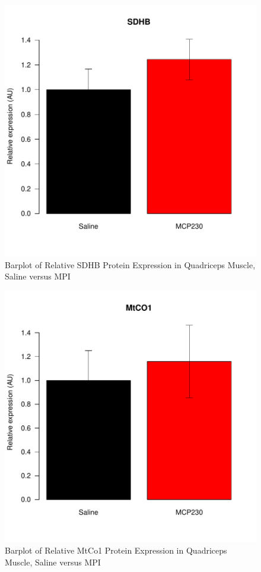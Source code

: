 \documentclass{article}
\begin{document}
\begin{figure}
\begin{center}
\includegraphics{2016-01-21_MitochondrialProteins-barplotSDHB}
\end{center}
\caption{Barplot of Relative SDHB Protein Expression in Quadriceps Muscle, Saline versus MPI}
\label{fig:barplotSDHB}
\end{figure}

\begin{figure}
\begin{center}
\includegraphics{2016-01-21_MitochondrialProteins-barplotMtCO1}
\end{center}
\caption{Barplot of Relative MtCo1 Protein Expression in Quadriceps Muscle, Saline versus MPI}
\label{fig:barplotMtCO1}
\end{figure}
\end{document}
